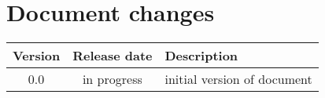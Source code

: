\section{Document changes}

\begin{longtable}{ccp{}}
\toprule
Version & Release date & Description \\
\midrule
0.0 & in progress & initial version of document \\
\bottomrule
\end{longtable}


